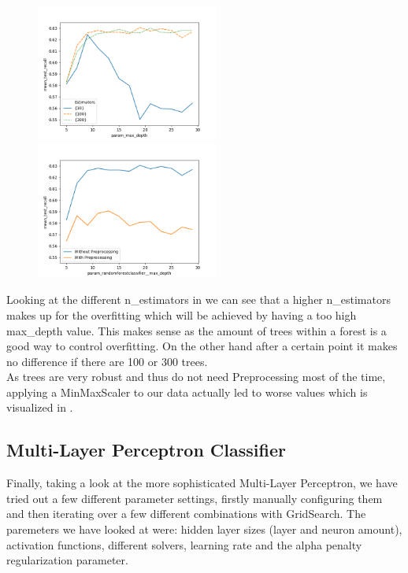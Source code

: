 \begin{figure}
\begin{floatrow}
    {\includegraphics[width=6cm]{plots/rfc_n_estimators_comparison.png}\label{fig:rf_n_estim}}
    {\includegraphics[width=6cm]{plots/rfc_preprocessing_comparison.png}\label{fig:rfc_pre}}
\end{floatrow}
\end{figure}
Looking at the different n\_estimators in  we can see that a higher n\_estimators makes up for the overfitting which will be achieved by having a too high max\_depth value. This makes sense as the amount of trees within a forest is a good way to control overfitting. On the other hand after a certain point it makes no difference if there are 100 or 300 trees. \\
\newline
As trees are very robust and thus do not need Preprocessing most of the time, applying a MinMaxScaler to our data actually led to worse values which is visualized in .

\subsection{Multi-Layer Perceptron Classifier}
Finally, taking a look at the more sophisticated Multi-Layer Perceptron, we have tried out a few different parameter settings, firstly manually configuring them and then iterating over a few different combinations with GridSearch. The paremeters we have looked at were: hidden layer sizes (layer and neuron amount), activation functions, different solvers, learning rate and the alpha penalty regularization parameter.


